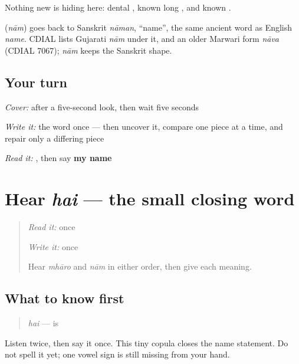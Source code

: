 Nothing new is hiding here: dental \textbf{}, known long \textbf{}, and known \textbf{}.

\begin{cousinweb}
\textbf{} (\emph{nām}) goes back to Sanskrit \emph{nāman}, \textquotedblleft{}name\textquotedblright{}, the same ancient word as English \emph{name}. CDIAL lists Gujarati \emph{nām} under it, and an older Marwari form \emph{nāva} (CDIAL 7067); \emph{nām} keeps the Sanskrit shape.
\end{cousinweb}

\subsection*{Your turn}
\emph{Cover:} \textbf{} after a five-second look, then wait five seconds

\emph{Write it:} the word once — then uncover it, compare one piece at a time, and repair only a differing piece

\begin{tcolorbox}[breakable,colback=teal!4,colframe=teal!35!black,title={Before you move on}]
\emph{Read it:} \textbf{ }, then say \textbf{my name}
\end{tcolorbox}
\section[hai]{Hear \emph{hai} — the small closing word}

\label{lesson:MW-C05-hear-hai}



\begin{quote}
\emph{Read it:} \textbf{} once

\emph{Write it:} \textbf{} once

Hear \emph{mhāro} and \emph{nām} in either order, then give each meaning.
\end{quote}

\subsection*{What to know first}
\begin{quote}
\emph{hai} — is
\end{quote}

Listen twice, then say it once. This tiny copula closes the name statement. Do not spell it yet; one vowel sign is still missing from your hand.

